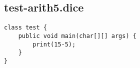 \subsection{test-arith5.dice}
\begin{verbatim}
class test {
	public void main(char[][] args) {
		print(15-5);
	}
}

\end{verbatim}